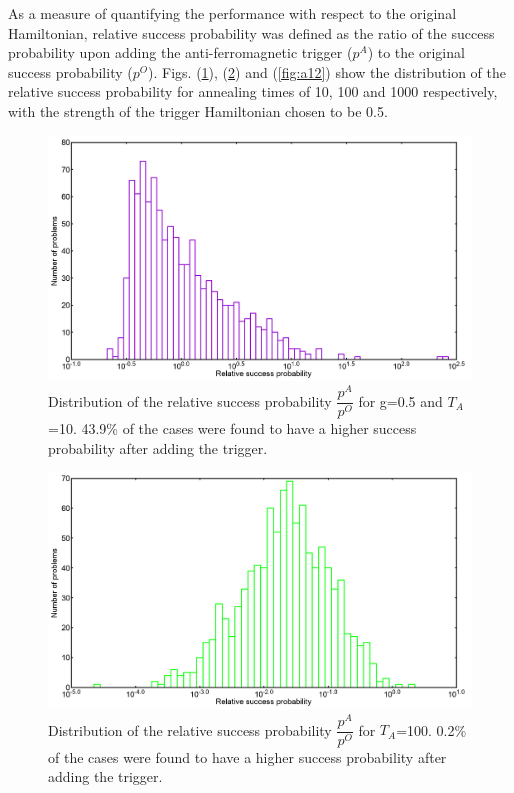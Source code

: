 \documentclass[../main.tex]{subfiles}
\begin{document}
As a measure of quantifying the performance with respect to the original Hamiltonian, relative success probability was defined as the ratio of the success probability upon adding the anti-ferromagnetic trigger ($p^A$) to the original success probability ($p^O$). Figs. (\ref{fig:a10}), (\ref{fig:a11}) and (\ref{fig:a12}) show the  distribution of the relative success probability for annealing times of 10, 100 and 1000 respectively, with the strength of the trigger Hamiltonian chosen to be 0.5.

\begin{figure}[H]
\centering 
\includegraphics[scale=0.24]{A_T10_g0.png}
\caption{Distribution of the relative success probability $\dfrac{p^A}{p^O}$ for g=0.5 and $T_A$=10. 43.9\% of the cases were found to have a higher success probability after adding the trigger.}
\label{fig:a10}
\end{figure}
\begin{figure}[H]
\centering 
\includegraphics[scale=0.24]{A_T100_g0.png}
\caption{Distribution of the relative success probability $\dfrac{p^A}{p^O}$ for $T_A$=100. 0.2\% of the cases were found to have a higher success probability after adding the trigger. }
\label{fig:a11}
\end{figure}
\end{document}
